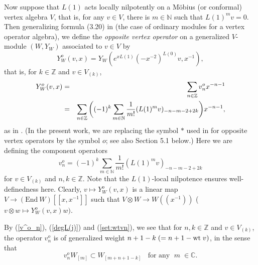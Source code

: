 \documentclass[12pt]{article}
\begin{document}
Now suppose that $L(1)$ acts locally nilpotently on a M\"obius (or
conformal) vertex algebra $V$, that is, for
any $v\in V$, there is $m\in {\mathbb N}$ such that $L(1)^mv=0$.  Then
generalizing formula (3.20) in \cite{tensor1} (the case of ordinary
modules for a vertex operator algebra), we define the {\it opposite
vertex operator} on a generalized $V$-module $(W,Y_W)$ associated to
$v\in V$ by
\begin{equation}\label{yo}
Y^o_W(v,x)=Y_W(e^{xL(1)}(-x^{-2})^{L(0)}v,x^{-1}),
\end{equation}
that is, for $k\in {\mathbb Z}$ and $v\in V_{(k)}$,
\begin{eqnarray}\label{yo1}
Y^o_W(v,x)&=&\sum_{n \in {\mathbb Z}} v^o_n x^{-n-1}\nonumber\\
&=&\sum_{n\in {\mathbb Z}}\bigg((-1)^k\sum_{m\in {\mathbb N}}
\frac{1}{m!}(L(1)^mv)_{-n-m-2+2k}\bigg)x^{-n-1},
\end{eqnarray}
as in \cite{tensor1}. (In the present work, we are replacing the 
symbol $*$ used in \cite{tensor1} for opposite vertex operators
by the symbol $o$; see also Section 5.1 below.)
Here we are defining the component operators
\begin{equation}\label{v^o_n}
v^o_n=(-1)^k\sum_{m\in {\mathbb N}}\frac{1}{m!}(L(1)^mv)_{-n-m-2+2k}
\end{equation}
for $v\in V_{(k)}$ and $n,k\in {\mathbb Z}$. Note that the $L(1)$-local
nilpotence ensures well-definedness here.  Clearly, $v \mapsto
Y^o_W(v,x)$ is a linear map $V \to (\mbox{End} \ W)[[x,x^{-1}]]$ such
that $V \otimes W \to W((x^{-1}))$ ($v \otimes w \mapsto
Y^o_W(v,x)w)$.

By (\ref{v^o_n}), (\ref{degL(j)}) and (\ref{set:wtvn}), we see that
for $n,k\in {\mathbb Z}$ and $v\in V_{(k)}$, the operator $v^o_n$ is of
generalized weight $n+1-k\;(=n+1-\mbox{\rm wt}\; v)$, in the sense that
\begin{equation}\label{v^o-deg}
v^o_nW_{[m]}\subset W_{[m+n+1-k]}\;\;\mbox{ for any }\;m\;\in{\mathbb C}.
\end{equation}
\end{document}
